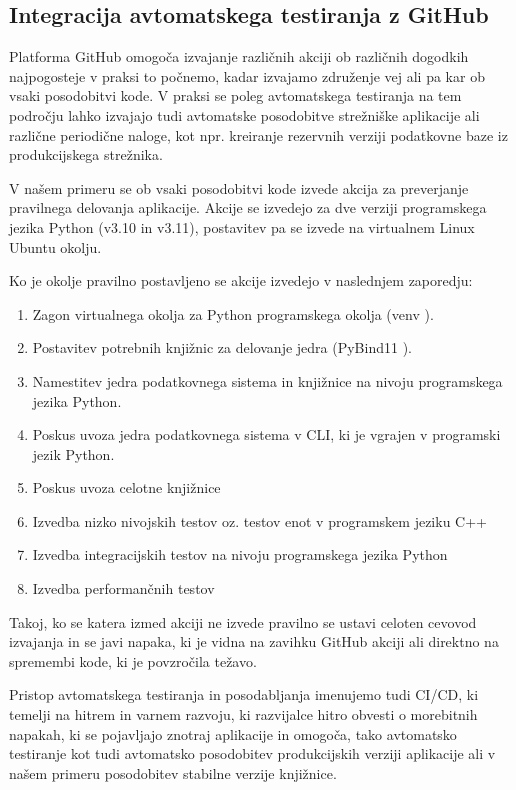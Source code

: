 \documentclass[a4paper,12pt,openright]{book}
\begin{document}
   \subsection{Integracija avtomatskega testiranja z GitHub}

   Platforma GitHub omogoča izvajanje različnih akciji ob različnih dogodkih najpogosteje v praksi to počnemo, kadar izvajamo združenje vej ali pa kar ob vsaki posodobitvi kode. V praksi se poleg avtomatskega testiranja na tem področju lahko izvajajo tudi avtomatske posodobitve strežniške aplikacije ali različne periodične naloge, kot npr. kreiranje rezervnih verziji podatkovne baze iz produkcijskega strežnika.

   V našem primeru se ob vsaki posodobitvi kode izvede akcija za preverjanje pravilnega delovanja aplikacije. Akcije se izvedejo za dve verziji programskega jezika Python (v3.10 in v3.11), postavitev pa se izvede na virtualnem Linux Ubuntu okolju.

   Ko je okolje pravilno postavljeno se akcije izvedejo v naslednjem zaporedju:
   \begin{enumerate}
       \item Zagon virtualnega okolja za Python programskega okolja (venv \cite{PY_VENV_DOCS}).
       \item Postavitev potrebnih knjižnic za delovanje jedra (PyBind11 \cite{PYBIND11_GITHUB}).
       \item Namestitev jedra podatkovnega sistema in knjižnice na nivoju programskega jezika Python.
       \item Poskus uvoza jedra podatkovnega sistema v CLI, ki je vgrajen v programski jezik Python.
       \item Poskus uvoza celotne knjižnice
       \item Izvedba nizko nivojskih testov oz. testov enot v programskem jeziku C++
       \item Izvedba integracijskih testov na nivoju programskega jezika Python
       \item Izvedba performančnih testov
   \end{enumerate}

    \noindent
   Takoj, ko se katera izmed akciji ne izvede pravilno se ustavi celoten cevovod izvajanja in se javi napaka, ki je vidna na zavihku GitHub akciji ali direktno na spremembi kode, ki je povzročila težavo.

   Pristop avtomatskega testiranja in posodabljanja imenujemo tudi CI/CD, ki temelji na hitrem in varnem razvoju, ki razvijalce hitro obvesti o morebitnih napakah, ki se pojavljajo znotraj aplikacije in omogoča, tako avtomatsko testiranje kot tudi avtomatsko posodobitev produkcijskih verziji aplikacije ali v našem primeru posodobitev stabilne verzije knjižnice.
   
\end{document}
